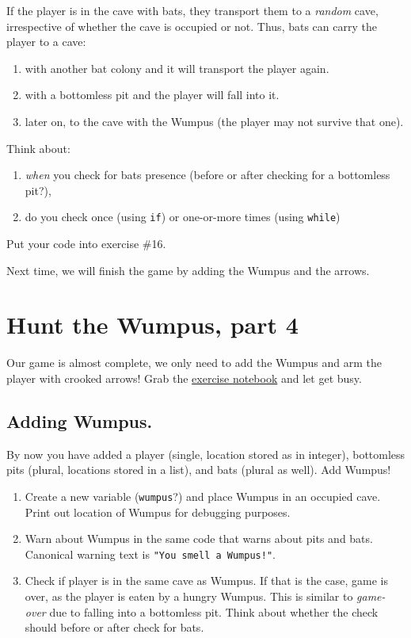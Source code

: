 \documentclass[
]{book}
\providecommand{\tightlist}{%
  \setlength{\itemsep}{0pt}\setlength{\parskip}{0pt}}
\begin{document}
If the player is in the cave with bats, they transport them to a \emph{random} cave, irrespective of whether the cave is occupied or not. Thus, bats can carry the player to a cave:

\begin{enumerate}
\def\labelenumi{\arabic{enumi}.}
\tightlist
\item
  with another bat colony and it will transport the player again.
\item
  with a bottomless pit and the player will fall into it.
\item
  later on, to the cave with the Wumpus (the player may not survive that one).
\end{enumerate}

Think about:

\begin{enumerate}
\def\labelenumi{\arabic{enumi}.}
\tightlist
\item
  \emph{when} you check for bats presence (before or after checking for a bottomless pit?),
\item
  do you check once (using \texttt{if}) or one-or-more times (using \texttt{while})
\end{enumerate}

Put your code into exercise \#16.

Next time, we will finish the game by adding the Wumpus and the arrows.

\hypertarget{seminar07}{%
\chapter{Hunt the Wumpus, part 4}\label{seminar07}}

Our game is almost complete, we only need to add the Wumpus and arm the player with crooked arrows! Grab the \href{notebooks/Seminar\%2007.\%20Hunt\%20the\%20Wumpus,\%20part\%204.ipynb}{exercise notebook} and let get busy.

\hypertarget{adding-wumpus.}{%
\section{Adding Wumpus.}\label{adding-wumpus.}}

By now you have added a player (single, location stored as in integer), bottomless pits (plural, locations stored in a list), and bats (plural as well). Add Wumpus!

\begin{enumerate}
\def\labelenumi{\arabic{enumi}.}
\tightlist
\item
  Create a new variable (\texttt{wumpus}?) and place Wumpus in an occupied cave. Print out location of Wumpus for debugging purposes.
\item
  Warn about Wumpus in the same code that warns about pits and bats. Canonical warning text is \texttt{"You\ smell\ a\ Wumpus!"}.
\item
  Check if player is in the same cave as Wumpus. If that is the case, game is over, as the player is eaten by a hungry Wumpus. This is similar to \emph{game-over} due to falling into a bottomless pit. Think about whether the check should before or after check for bats.
\end{enumerate}
\end{document}
